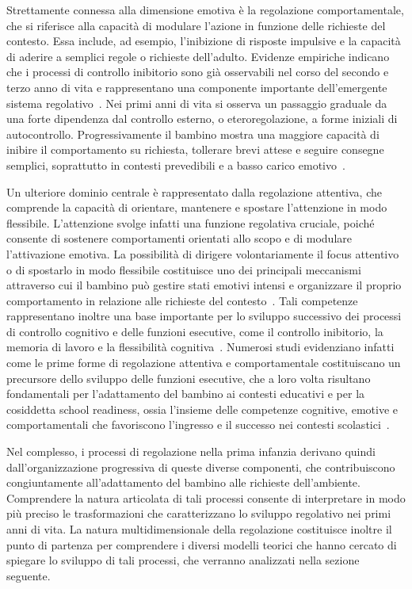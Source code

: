         Strettamente connessa alla dimensione emotiva è la regolazione comportamentale, che si riferisce alla capacità di modulare l'azione in funzione delle richieste del contesto. Essa include, ad esempio, l'inibizione di risposte impulsive e la capacità di aderire a semplici regole o richieste dell'adulto. Evidenze empiriche indicano che i processi di controllo inibitorio sono già osservabili nel corso del secondo e terzo anno di vita e rappresentano una componente importante dell'emergente sistema regolativo~\cite{gandolfi2014}. Nei primi anni di vita si osserva un passaggio graduale da una forte dipendenza dal controllo esterno, o eteroregolazione, a forme iniziali di autocontrollo. Progressivamente il bambino mostra una maggiore capacità di inibire il comportamento su richiesta, tollerare brevi attese e seguire consegne semplici, soprattutto in contesti prevedibili e a basso carico emotivo~\cite{kochanska2000,kochanska2001}.

        Un ulteriore dominio centrale è rappresentato dalla regolazione attentiva, che comprende la capacità di orientare, mantenere e spostare l'attenzione in modo flessibile. L'attenzione svolge infatti una funzione regolativa cruciale, poiché consente di sostenere comportamenti orientati allo scopo e di modulare l'attivazione emotiva. La possibilità di dirigere volontariamente il focus attentivo o di spostarlo in modo flessibile costituisce uno dei principali meccanismi attraverso cui il bambino può gestire stati emotivi intensi e organizzare il proprio comportamento in relazione alle richieste del contesto~\cite{rothbart2006}. Tali competenze rappresentano inoltre una base importante per lo sviluppo successivo dei processi di controllo cognitivo e delle funzioni esecutive, come il controllo inibitorio, la memoria di lavoro e la flessibilità cognitiva~\cite{diamond2013}. Numerosi studi evidenziano infatti come le prime forme di regolazione attentiva e comportamentale costituiscano un precursore dello sviluppo delle funzioni esecutive, che a loro volta risultano fondamentali per l'adattamento del bambino ai contesti educativi e per la cosiddetta school readiness, ossia l'insieme delle competenze cognitive, emotive e comportamentali che favoriscono l'ingresso e il successo nei contesti scolastici~\cite{blair2007}.

        Nel complesso, i processi di regolazione nella prima infanzia derivano quindi dall'organizzazione progressiva di queste diverse componenti, che contribuiscono congiuntamente all'adattamento del bambino alle richieste dell'ambiente. Comprendere la natura articolata di tali processi consente di interpretare in modo più preciso le trasformazioni che caratterizzano lo sviluppo regolativo nei primi anni di vita. La natura multidimensionale della regolazione costituisce inoltre il punto di partenza per comprendere i diversi modelli teorici che hanno cercato di spiegare lo sviluppo di tali processi, che verranno analizzati nella sezione seguente.

